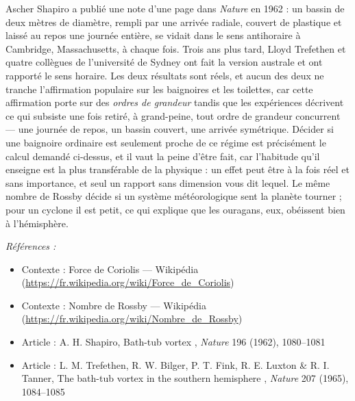 \documentclass[11pt]{article}
\newenvironment{refs}{\par\small\noindent\emph{Références :}\begin{itemize}\setlength\itemsep{0pt}}{\end{itemize}\normalsize}
\begin{document}
\noindent Ascher Shapiro a publié une note d'une page dans \textit{Nature} en 1962 :
un bassin de deux mètres de diamètre, rempli par une arrivée radiale, couvert de plastique et
laissé au repos une journée entière, se vidait dans le sens antihoraire à Cambridge,
Massachusetts, à chaque fois. Trois ans plus tard, Lloyd Trefethen et quatre collègues de
l'université de Sydney ont fait la version australe et ont rapporté le sens horaire. Les deux
résultats sont réels, et aucun des deux ne tranche l'affirmation populaire sur les baignoires
et les toilettes, car cette affirmation porte sur des \textit{ordres de grandeur} tandis que
les expériences décrivent ce qui subsiste une fois retiré, à grand-peine, tout ordre de
grandeur concurrent --- une journée de repos, un bassin couvert, une arrivée symétrique.
Décider si une baignoire ordinaire est seulement proche de ce régime est précisément le
calcul demandé ci-dessus, et il vaut la peine d'être fait, car l'habitude qu'il enseigne est
la plus transférable de la physique : un effet peut être à la fois réel et sans importance,
et seul un rapport sans dimension vous dit lequel. Le même nombre de Rossby décide si un
système météorologique sent la planète tourner ; pour un cyclone il est petit, ce qui
explique que les ouragans, eux, obéissent bien à l'hémisphère.

\begin{refs}
\item Contexte : Force de Coriolis --- Wikipédia (\url{https://fr.wikipedia.org/wiki/Force_de_Coriolis})
\item Contexte : Nombre de Rossby --- Wikipédia (\url{https://fr.wikipedia.org/wiki/Nombre_de_Rossby})
\item Article : A. H. Shapiro, \og{} Bath-tub vortex \fg{}, \textit{Nature} 196 (1962), 1080--1081
\item Article : L. M. Trefethen, R. W. Bilger, P. T. Fink, R. E. Luxton \& R. I. Tanner, \og{} The bath-tub vortex in the southern hemisphere \fg{}, \textit{Nature} 207 (1965), 1084--1085
\end{refs}

\bigskip
\end{document}
